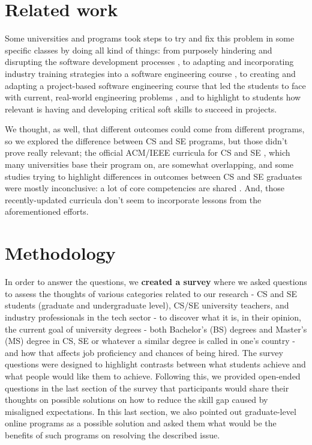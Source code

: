 \documentclass{sigchi}
\begin{document}
\section{Related work}
Some universities and programs took steps to try and fix this problem in some specific classes by doing all kind of things: from purposely hindering and disrupting the software development processes \cite{Dawson2000}, to adapting and incorporating industry training strategies into a software engineering course \cite{Portela2017}, to creating and adapting a project-based software engineering course that led the students to face with current, real-world engineering problems \cite{Delgado2017}, and to highlight to students how relevant is having and developing critical soft skills to succeed in projects\cite{Bastarrica2017}.

We thought, as well, that different outcomes could come from different programs, so we explored the difference between CS and SE programs, but those didn't prove really relevant; the official ACM/IEEE curricula for CS \cite{Force2013} and SE \cite{Ardis2015}, which many universities base their program on, are somewhat overlapping, and some studies trying to highlight differences in outcomes between CS and SE graduates were mostly inconclusive: a lot of core competencies are shared \cite{Meziane2004} \cite{Rasool2014}. And, those recently-updated curricula don't seem to incorporate lessons from the aforementioned efforts.

\section{Methodology}
In order to answer the questions, we \textbf{created a survey} where we asked questions to assess the thoughts of various categories related to our research - CS and SE students (graduate and undergraduate level), CS/SE university teachers, and industry professionals in the tech sector - to discover what it is, in their opinion, the current goal of university degrees - both Bachelor's (BS) degrees and Master's (MS) degree in CS, SE or whatever a similar degree is called in one's country - and how that affects job proficiency and chances of being hired. The survey questions were designed to highlight contrasts between what students achieve and what people would like them to achieve. Following this, we provided open-ended questions in the last section of the survey that participants would share their thoughts on possible solutions on how to reduce the skill gap caused by misaligned expectations. In this last section, we also pointed out graduate-level online programs as a possible solution and asked them what would be the benefits of such programs on resolving the described issue.
\end{document}
